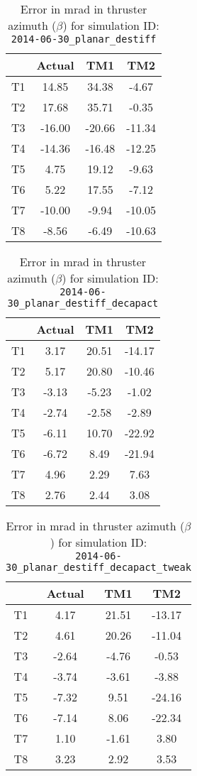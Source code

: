 \begin{table}[H]
\centering
\cprotect\caption{Error in mrad in thruster azimuth ($\beta$) for simulation ID:\\
\verb|2014-06-30_planar_destiff|}
\begin{tabular}{|c|c|c|c|} \hline
~ & Actual & TM1 & TM2 \\ \hline
T1 & 14.85 & 34.38 & -4.67 \\
T2 & 17.68 & 35.71 & -0.35 \\
T3 & -16.00 & -20.66 & -11.34 \\
T4 & -14.36 & -16.48 & -12.25 \\
T5 & 4.75 & 19.12 & -9.63 \\
T6 & 5.22 & 17.55 & -7.12 \\
T7 & -10.00 & -9.94 & -10.05 \\
T8 & -8.56 & -6.49 & -10.63 \\ \hline
\end{tabular}
\label{beta-2}
\end{table}

\begin{table}[H]
\centering
\cprotect\caption{Error in mrad in thruster azimuth ($\beta$) for simulation ID:\\
\verb|2014-06-30_planar_destiff_decapact|}
\begin{tabular}{|c|c|c|c|} \hline
~ & Actual & TM1 & TM2 \\ \hline
T1 & 3.17 & 20.51 & -14.17 \\
T2 & 5.17 & 20.80 & -10.46 \\
T3 & -3.13 & -5.23 & -1.02 \\
T4 & -2.74 & -2.58 & -2.89 \\
T5 & -6.11 & 10.70 & -22.92 \\
T6 & -6.72 & 8.49 & -21.94 \\
T7 & 4.96 & 2.29 & 7.63 \\
T8 & 2.76 & 2.44 & 3.08 \\ \hline
\end{tabular}
\label{beta-3}
\end{table}

\begin{table}[H]
\centering
\cprotect\caption{Error in mrad in thruster azimuth ($\beta$) for simulation ID:\\
\verb|2014-06-30_planar_destiff_decapact_tweak|}
\begin{tabular}{|c|c|c|c|} \hline
~ & Actual & TM1 & TM2 \\ \hline
T1 & 4.17 & 21.51 & -13.17 \\
T2 & 4.61 & 20.26 & -11.04 \\
T3 & -2.64 & -4.76 & -0.53 \\
T4 & -3.74 & -3.61 & -3.88 \\
T5 & -7.32 & 9.51 & -24.16 \\
T6 & -7.14 & 8.06 & -22.34 \\
T7 & 1.10 & -1.61 & 3.80 \\
T8 & 3.23 & 2.92 & 3.53 \\ \hline
\end{tabular}
\label{beta-4}
\end{table}

